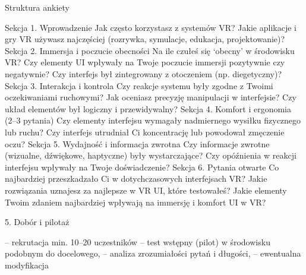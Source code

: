 
Struktura ankiety 


Sekcja 1. Wprowadzenie 
Jak często korzystasz z systemów VR?
Jakie aplikacje i gry VR używasz najczęściej (rozrywka, symulacje, edukacja, projektowanie)?
Sekcja 2. Immersja i poczucie obecności 
Na ile czułeś się ‘obecny’ w środowisku VR?
Czy elementy UI wpływały na Twoje poczucie immersji pozytywnie czy negatywnie?
Czy interfejs był zintegrowany z otoczeniem (np. diegetyczny)?
Sekcja 3. Interakcja i kontrola 
Czy reakcje systemu były zgodne z Twoimi oczekiwaniami ruchowymi?
Jak oceniasz precyzję manipulacji w interfejsie?
Czy układ elementów był logiczny i przewidywalny?
Sekcja 4. Komfort i ergonomia (2–3 pytania)
Czy elementy interfejsu wymagały nadmiernego wysiłku fizycznego lub ruchu?
Czy interfejs utrudniał Ci koncentrację lub powodował zmęczenie oczu?
Sekcja 5. Wydajność i informacja zwrotna
Czy informacje zwrotne (wizualne, dźwiękowe, haptyczne) były wystarczające?
Czy opóźnienia w reakcji interfejsu wpływały na Twoje doświadczenie?
Sekcja 6. Pytania otwarte 
Co najbardziej przeszkadzało Ci w dotychczasowych interfejsach VR?
Jakie rozwiązania uznajesz za najlepsze w VR UI, które testowałeś?
Jakie elementy Twoim zdaniem najbardziej wpływają na immersję i komfort UI w VR?

5. Dobór i pilotaż

– rekrutacja min. 10–20 uczestników
– test wstępny (pilot) w środowisku podobnym do docelowego,
– analiza zrozumiałości pytań i długości, 
– ewentualna modyfikacja
